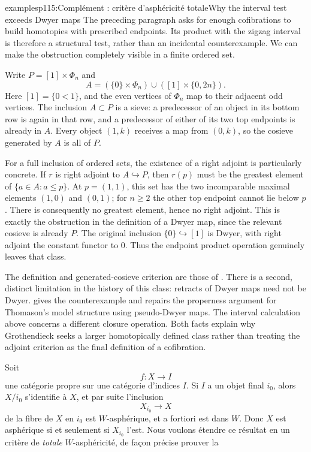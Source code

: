\begin{dcomment}{examples}{p115:Complément : critère d'asphéricité totale}{Why the interval test exceeds Dwyer maps}
The preceding paragraph asks for enough cofibrations to build homotopies with prescribed endpoints.  Its product with the zigzag interval is therefore a structural test, rather than an incidental counterexample.  We can make the obstruction completely visible in a finite ordered set.

Write $P=[1]\times\Phi_n$ and
\[
 A=(\{0\}\times\Phi_n)\cup([1]\times\{0,2n\}).
\]
Here $[1]=\{0<1\}$, and the even vertices of $\Phi_n$ map to their adjacent odd vertices.  The inclusion $A\subset P$ is a sieve: a predecessor of an object in its bottom row is again in that row, and a predecessor of either of its two top endpoints is already in $A$.  Every object $(1,k)$ receives a map from $(0,k)$, so the cosieve generated by $A$ is all of $P$.

For a full inclusion of ordered sets, the existence of a right adjoint is particularly concrete.  If $r$ is right adjoint to $A\hookrightarrow P$, then $r(p)$ must be the greatest element of $\{a\in A:a\leq p\}$.  At $p=(1,1)$, this set has the two incomparable maximal elements $(1,0)$ and $(0,1)$; for $n\geq2$ the other top endpoint cannot lie below $p$.  There is consequently no greatest element, hence no right adjoint.  This is exactly the obstruction in the definition of a Dwyer map, since the relevant cosieve is already $P$.  The original inclusion $\{0\}\hookrightarrow[1]$ is Dwyer, with right adjoint the constant functor to $0$.  Thus the endpoint product operation genuinely leaves that class.

The definition and generated-cosieve criterion are those of \citet[Definition~4.1 and Lemma~5.2]{Thomason1980}.  There is a second, distinct limitation in the history of this class: retracts of Dwyer maps need not be Dwyer.  \citet[pp.~228--231, especially Proposition~2]{Cisinski1999Dwyer} gives the counterexample and repairs the properness argument for Thomason's model structure using pseudo-Dwyer maps.  The interval calculation above concerns a different closure operation.  Both facts explain why Grothendieck seeks a larger homotopically defined class rather than treating the adjoint criterion as the final definition of a cofibration.
\end{dcomment}


Soit
\[
f : X \longrightarrow I
\]
une catégorie propre sur une catégorie d'indices $I$. Si $I$ a un objet final $i_0$, alors $X/i_0$ s'identifie à $X$, et par suite l'inclusion
\[
X_{i_0} \longrightarrow X
\]
de la fibre de $X$ en $i_0$ est $W$-asphérique, et a fortiori est dans $W$. Donc $X$ est asphérique si et seulement si $X_{i_0}$ l'est. Nous voulons étendre ce résultat en un critère de \textit{totale} $W$-asphéricité, de façon précise prouver la

